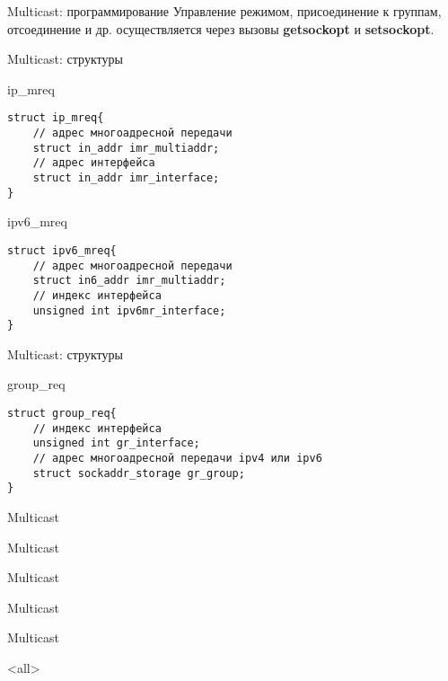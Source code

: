 \begin{frame}{Multicast: программирование}
	Управление режимом,  присоединение к группам,  отсоединение и др. 
	осуществляется через вызовы {\bf getsockopt} и {\bf setsockopt}.
\end{frame}


\begin{frame}[fragile]{Multicast: структуры}
	\begin{block}{ip\_mreq}
		\begin{lstlisting}
struct ip_mreq{
	// адрес многоадресной передачи
	struct in_addr imr_multiaddr;
	// адрес интерфейса
	struct in_addr imr_interface;
}
		\end{lstlisting}
	\end{block}
	\begin{block}{ipv6\_mreq}
		\begin{lstlisting}
struct ipv6_mreq{
	// адрес многоадресной передачи
	struct in6_addr imr_multiaddr;
	// индекс интерфейса
	unsigned int ipv6mr_interface;
}
		\end{lstlisting}
	\end{block}
	
\end{frame}

\begin{frame}[fragile]{Multicast: структуры}
	\begin{block}{group\_req}
		\begin{lstlisting}
struct group_req{
	// индекс интерфейса
	unsigned int gr_interface;
	// адрес многоадресной передачи ipv4 или ipv6
	struct sockaddr_storage gr_group;
}
		\end{lstlisting}
	\end{block}
	
\end{frame}


\begin{frame}{Multicast}

\end{frame}

\begin{frame}{Multicast}

\end{frame}

\begin{frame}{Multicast}

\end{frame}

\begin{frame}{Multicast}

\end{frame}

\begin{frame}{Multicast}

\end{frame}




\mode<all>{}


